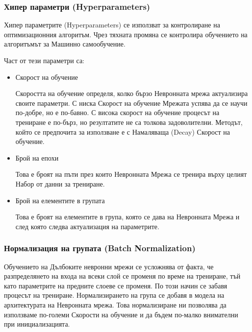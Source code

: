 \documentclass{article}
\begin{document}
    \subsubsection{Хипер параметри (Hyperparameters)}

    Хипер параметрите (Hyperparameters) се използват за контролиране на оптимизационния алгоритъм. Чрез тяхната промяна се
    контролира обучението на алгоритъмът за Машинно самообучение. \cite{deep-learning-practitioner}

    Част от тези параметри са:

    \begin{itemize}

        \item Скорост на обучение

        Скоростта на обучение определя, колко бързо Невронната мрежа актуализира своите параметри. С ниска Скорост на
        обучение Мрежата успява да се научи по-добре, но е по-бавно. С висока скорост на обучение процесът на трениране е
        по-бърз, но резултатите не са толкова задоволителни. Методът, който се предпочита за използване е с Намаляваща
        (Decay) Скорост на обучение.

        \item Брой на епохи

        Това е броят на пъти през които Невронната Мрежа се тренира върху целият Набор от данни за трениране.

        \item Брой на елементите в групата

        Това е броят на елементите в група, която се дава на Невронната Мрежа и след която следва актуализация на параметрите.

    \end{itemize}

    \subsubsection{Нормализация на групата (Batch Normalization)}

    Обучението на Дълбоките невронни мрежи се усложнява от факта, че разпределянето на входа на всеки слой се променя по
    време на трениране, тъй като параметрите на предните слоеве се променя. По този начин се забавя процесът на трениране.
    Нормализирането на група се добавя в модела на архитектурата на Невронната мрежа. Това нормализиране ни позволява да
    използваме по-големи Скорости на обучение и да бъдем по-малко внимателни при инициализацията. \cite{batch-normalization}
\end{document}
